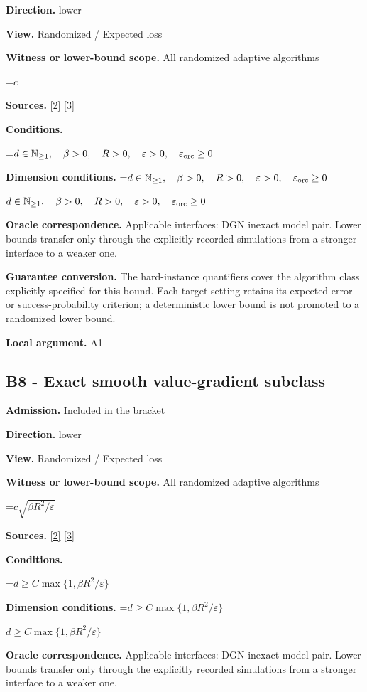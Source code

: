 \documentclass[10pt,a4paper]{article}
\newcommand{\AtlasMath}[1]{\par\begingroup\centering\setbox0=\hbox{$\displaystyle #1$}\ifdim\wd0>1.4\linewidth\typeout{ATLAS WIDE FORMULA: \the\wd0}\fi\ifdim\wd0>\linewidth\resizebox{\linewidth}{!}{\box0}\else\box0\fi\par\endgroup}
\newcommand{\AtlasInlineMath}[1]{\begingroup\setbox0=\hbox{$#1$}\ifdim\wd0>.4\linewidth\endgroup\AtlasMath{#1}\else\endgroup$#1$\fi}
\begin{document}
\textbf{Direction.} lower

\textbf{View.} Randomized / Expected loss

\textbf{Witness or lower-bound scope.} All randomized adaptive algorithms

\AtlasMath{c}
\textbf{Sources.} \href{https://arxiv.org/pdf/2609.10874}{[2]} \href{https://arxiv.org/pdf/1407.5144}{[3]}

\textbf{Conditions.} 
\AtlasMath{d\in\mathbb{N}_{\ge1},\quad \beta>0,\quad R>0,\quad \varepsilon>0,\quad \varepsilon_{\rm orc}\ge0}


\textbf{Dimension conditions.} \AtlasInlineMath{d\in\mathbb{N}_{\ge1},\quad \beta>0,\quad R>0,\quad \varepsilon>0,\quad \varepsilon_{\rm orc}\ge0}

\textbf{Oracle correspondence.} Applicable interfaces: DGN inexact model pair. Lower bounds transfer only through the explicitly recorded simulations from a stronger interface to a weaker one.

\textbf{Guarantee conversion.} The hard-instance quantifiers cover the algorithm class explicitly specified for this bound. Each target setting retains its expected-error or success-probability criterion; a deterministic lower bound is not promoted to a randomized lower bound.

\textbf{Local argument.} A1

\subsection{B8 - Exact smooth value-gradient subclass}
\textbf{Admission.} Included in the bracket

\textbf{Direction.} lower

\textbf{View.} Randomized / Expected loss

\textbf{Witness or lower-bound scope.} All randomized adaptive algorithms

\AtlasMath{c\sqrt{\beta R^2/\varepsilon}}
\textbf{Sources.} \href{https://arxiv.org/pdf/2609.10874}{[2]} \href{https://arxiv.org/pdf/1407.5144}{[3]}

\textbf{Conditions.} 
\AtlasMath{d\ge C\max\{1,\beta R^2/\varepsilon\}}


\textbf{Dimension conditions.} \AtlasInlineMath{d\ge C\max\{1,\beta R^2/\varepsilon\}}

\textbf{Oracle correspondence.} Applicable interfaces: DGN inexact model pair. Lower bounds transfer only through the explicitly recorded simulations from a stronger interface to a weaker one.
\end{document}
